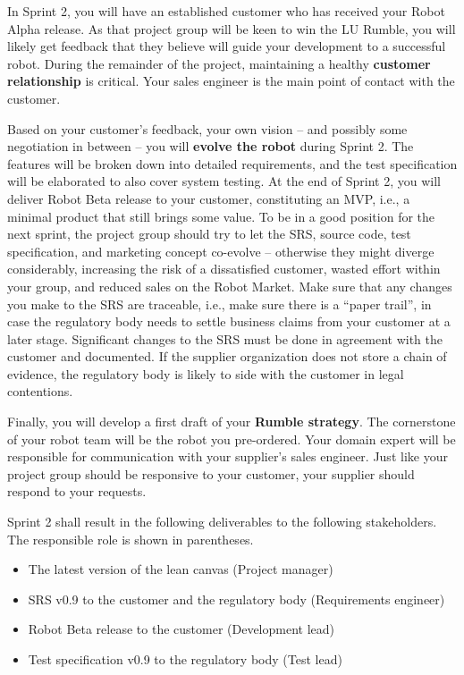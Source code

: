 \documentclass{scrreprt}
\begin{document}
In Sprint 2, you will have an established customer who has received your Robot Alpha release. As that project group will be keen to win the LU Rumble, you will likely get feedback that they believe will guide your development to a successful robot. During the remainder of the project, maintaining a healthy \textbf{customer relationship} is critical. Your sales engineer is the main point of contact with the customer.

Based on your customer's feedback, your own vision -- and possibly some negotiation in between -- you will \textbf{evolve the robot} during Sprint 2. The features will be broken down into detailed requirements, and the test specification will be elaborated to also cover system testing. At the end of Sprint 2, you will deliver Robot Beta release to your customer, constituting an MVP, i.e., a minimal product that still brings some value. To be in a good position for the next sprint, the project group should try to let the SRS, source code, test specification, and marketing concept co-evolve -- otherwise they might diverge considerably, increasing the risk of a dissatisfied customer, wasted effort within your group, and reduced sales on the Robot Market. Make sure that any changes you make to the SRS are traceable, i.e., make sure there is a ``paper trail'', in case the regulatory body needs to settle business claims from your customer at a later stage. Significant changes to the SRS must be done in agreement with the customer and documented. If the supplier organization does not store a chain of evidence, the regulatory body is likely to side with the customer in legal contentions.

Finally, you will develop a first draft of your \textbf{Rumble strategy}. The cornerstone of your robot team will be the robot you pre-ordered. Your domain expert will be responsible for communication with your supplier's sales engineer. Just like your project group should be responsive to your customer, your supplier should respond to your requests.

Sprint 2 shall result in the following deliverables to the following stakeholders. The responsible role is shown in parentheses.
\begin{itemize}
\item The latest version of the lean canvas (Project manager)
\item SRS v0.9 to the customer and the regulatory body (Requirements engineer)
\item Robot Beta release to the customer (Development lead)
\item Test specification v0.9 to the regulatory body (Test lead)
\end{itemize}
\end{document}
